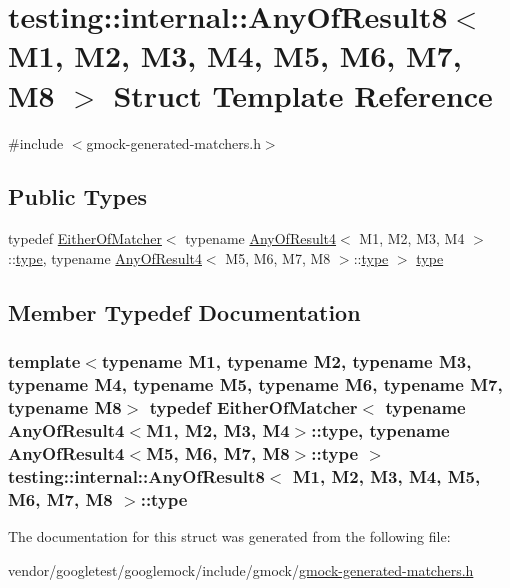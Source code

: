 \hypertarget{structtesting_1_1internal_1_1AnyOfResult8}{}\section{testing\+:\+:internal\+:\+:Any\+Of\+Result8$<$ M1, M2, M3, M4, M5, M6, M7, M8 $>$ Struct Template Reference}
\label{structtesting_1_1internal_1_1AnyOfResult8}


{\ttfamily \#include $<$gmock-\/generated-\/matchers.\+h$>$}

\subsection*{Public Types}
\begin{DoxyCompactItemize}
\item 
typedef \hyperlink{classtesting_1_1internal_1_1EitherOfMatcher}{Either\+Of\+Matcher}$<$ typename \hyperlink{structtesting_1_1internal_1_1AnyOfResult4}{Any\+Of\+Result4}$<$ M1, M2, M3, M4 $>$\+::\hyperlink{structtesting_1_1internal_1_1AnyOfResult8_a8f8a1e78a019965c24bd22c78885747d}{type}, typename \hyperlink{structtesting_1_1internal_1_1AnyOfResult4}{Any\+Of\+Result4}$<$ M5, M6, M7, M8 $>$\+::\hyperlink{structtesting_1_1internal_1_1AnyOfResult8_a8f8a1e78a019965c24bd22c78885747d}{type} $>$ \hyperlink{structtesting_1_1internal_1_1AnyOfResult8_a8f8a1e78a019965c24bd22c78885747d}{type}
\end{DoxyCompactItemize}


\subsection{Member Typedef Documentation}
\subsubsection[{\texorpdfstring{type}{type}}]{\setlength{\rightskip}{0pt plus 5cm}template$<$typename M1, typename M2, typename M3, typename M4, typename M5, typename M6, typename M7, typename M8$>$ typedef {\bf Either\+Of\+Matcher}$<$ typename {\bf Any\+Of\+Result4}$<$M1, M2, M3, M4$>$\+::{\bf type}, typename {\bf Any\+Of\+Result4}$<$M5, M6, M7, M8$>$\+::{\bf type} $>$ {\bf testing\+::internal\+::\+Any\+Of\+Result8}$<$ M1, M2, M3, M4, M5, M6, M7, M8 $>$\+::{\bf type}}\hypertarget{structtesting_1_1internal_1_1AnyOfResult8_a8f8a1e78a019965c24bd22c78885747d}{}\label{structtesting_1_1internal_1_1AnyOfResult8_a8f8a1e78a019965c24bd22c78885747d}


The documentation for this struct was generated from the following file\+:\begin{DoxyCompactItemize}
\item 
vendor/googletest/googlemock/include/gmock/\hyperlink{gmock-generated-matchers_8h}{gmock-\/generated-\/matchers.\+h}\end{DoxyCompactItemize}
